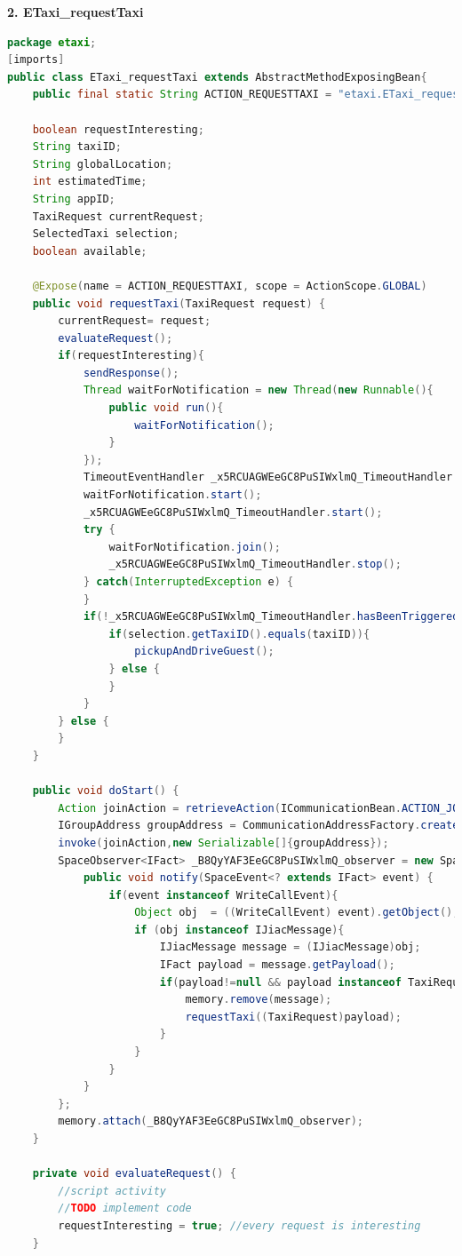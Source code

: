 \textbf{2. ETaxi\_requestTaxi}\\

\begin{lstlisting}[language=java, caption= Generated Agent Bean - ETaxi\_requestTaxi]
package etaxi;
[imports]
public class ETaxi_requestTaxi extends AbstractMethodExposingBean{
	public final static String ACTION_REQUESTTAXI = "etaxi.ETaxi_requestTaxi#requestTaxi"; 

	boolean requestInteresting;
	String taxiID;
	String globalLocation;
	int estimatedTime;
	String appID;
	TaxiRequest currentRequest;
	SelectedTaxi selection;
	boolean available;

	@Expose(name = ACTION_REQUESTTAXI, scope = ActionScope.GLOBAL)
	public void requestTaxi(TaxiRequest request) {
		currentRequest= request;
		evaluateRequest();
		if(requestInteresting){
			sendResponse();
			Thread waitForNotification = new Thread(new Runnable(){
				public void run(){
					waitForNotification();
				}
			});
			TimeoutEventHandler _x5RCUAGWEeGC8PuSIWxlmQ_TimeoutHandler = new TimeoutEventHandler(60000,waitForNotification);
			waitForNotification.start();
			_x5RCUAGWEeGC8PuSIWxlmQ_TimeoutHandler.start();
			try {
				waitForNotification.join();
				_x5RCUAGWEeGC8PuSIWxlmQ_TimeoutHandler.stop();
			} catch(InterruptedException e) {
			}
			if(!_x5RCUAGWEeGC8PuSIWxlmQ_TimeoutHandler.hasBeenTriggered()){
				if(selection.getTaxiID().equals(taxiID)){
					pickupAndDriveGuest();
				} else {
				}
			}
		} else {
		}
	}

	public void doStart() {
		Action joinAction = retrieveAction(ICommunicationBean.ACTION_JOIN_GROUP);
		IGroupAddress groupAddress = CommunicationAddressFactory.createGroupAddress("TaxiRequest");
		invoke(joinAction,new Serializable[]{groupAddress});
		SpaceObserver<IFact> _B8QyYAF3EeGC8PuSIWxlmQ_observer = new SpaceObserver<IFact>(){
			public void notify(SpaceEvent<? extends IFact> event) { 
				if(event instanceof WriteCallEvent){ 
					Object obj  = ((WriteCallEvent) event).getObject();
					if (obj instanceof IJiacMessage){
						IJiacMessage message = (IJiacMessage)obj;
						IFact payload = message.getPayload();
						if(payload!=null && payload instanceof TaxiRequest&& message.getHeader(IJiacMessage.Header.SEND_TO).equalsIgnoreCase("TaxiRequest")){
							memory.remove(message);
							requestTaxi((TaxiRequest)payload);
						}
					}
				}
			}
		};
		memory.attach(_B8QyYAF3EeGC8PuSIWxlmQ_observer);
	}

	private void evaluateRequest() {
		//script activity
		//TODO implement code 
		requestInteresting = true; //every request is interesting
	}


\end{lstlisting}
